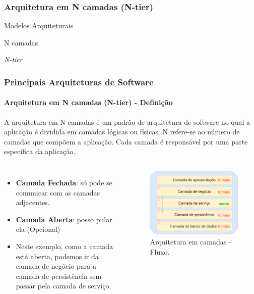 \documentclass[
	10pt, %
	t, %
]{beamer}
\begin{document}
\subsubsection{Arquitetura em N camadas (N-tier)}

\begin{frame}
	\begin{center}
		
		\bigskip\bigskip\bigskip\bigskip %
		{\Large Modelos Arquiteturais}
		
		\bigskip\bigskip %
		{\Huge N camadas}

		\smallskip
		{\small \textit{N-tier}}
	\end{center}

\end{frame}

\begin{frame}
	\frametitle{Principais Arquiteturas de Software}
	\framesubtitle{Arquitetura em N camadas (N-tier) - Definição}

	A arquitetura em N camadas é um padrão de arquitetura de software no qual a aplicação é dividida em camadas lógicas ou físicas. N refere-se ao número de camadas que compõem a aplicação. Cada camada é responsável por uma parte específica da aplicação.

	\begin{columns}
		\begin{itemize}
			\item {\small \textbf{Camada Fechada}: só pode se comunicar com as camadas adjacentes.}
			\item {\small \textbf{Camada Aberta}: posso pular ela (Opcional)}
			\item {\small Neste exemplo, como a camada está aberta, podemos ir da camada de negócio para a camada de persistência sem passar pela camada de serviço.}
		\end{itemize}
		\begin{figure}
			\centering
			\includegraphics[width=0.9\linewidth]{Images/n-tier-simple-2.png}
			\caption{Arquitetura em camadas - Fluxo.}\label{fig:n-tier-simple-2}
		\end{figure}
	\end{columns}

\end{frame}
\end{document}
